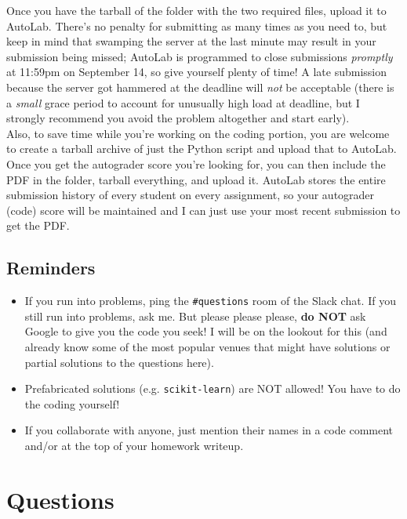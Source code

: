 \documentclass[paper=a4, fontsize=11pt]{scrartcl} %
\numberwithin{figure}{section} %
\numberwithin{table}{section} %
\begin{document}
Once you have the tarball of the folder with the two required files, upload it to AutoLab. There's no penalty for submitting as many times as you need to, but keep in mind that swamping the server at the last minute may result in your submission being missed; AutoLab is programmed to close submissions \emph{promptly} at 11:59pm on September 14, so give yourself plenty of time! A late submission because the server got hammered at the deadline will \emph{not} be acceptable (there is a \emph{small} grace period to account for unusually high load at deadline, but I strongly recommend you avoid the problem altogether and start early). \\

Also, to save time while you're working on the coding portion, you are welcome to create a tarball archive of just the Python script and upload that to AutoLab. Once you get the autograder score you're looking for, you can then include the PDF in the folder, tarball everything, and upload it. AutoLab stores the entire submission history of every student on every assignment, so your autograder (code) score will be maintained and I can just use your most recent submission to get the PDF.

\subsection{Reminders}

\begin{itemize}
	\item If you run into problems, ping the \texttt{\#questions} room of the Slack chat. If you still run into problems, ask me. But please please please, \textbf{do NOT} ask Google to give you the code you seek! I will be on the lookout for this (and already know some of the most popular venues that might have solutions or partial solutions to the questions here).
	\item Prefabricated solutions (e.g. \texttt{scikit-learn}) are NOT allowed! You have to do the coding yourself!
	\item If you collaborate with anyone, just mention their names in a code comment and/or at the top of your homework writeup.
\end{itemize}

\section*{Questions}
\setcounter{subsection}{0}
\end{document}
